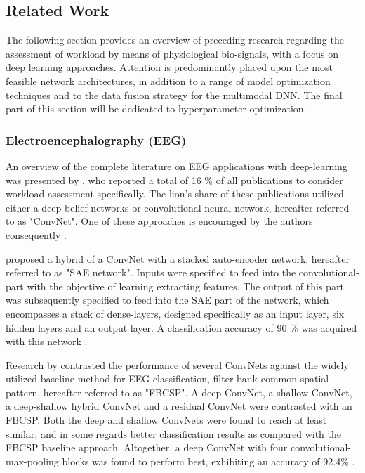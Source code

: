 \documentclass[12pt]{article}
\begin{document}
\subsection{Related Work} 
The following section provides an overview of preceding research regarding the assessment of workload by means of physiological bio-signals, with a focus on deep learning approaches. Attention is predominantly placed upon the most feasible network architectures, in addition to a range of model optimization techniques and to the data fusion strategy for the multimodal DNN. The final part of this section will be dedicated to hyperparameter optimization.  

\subsubsection{Electroencephalography (EEG)}
An overview of the complete literature on EEG applications with deep-learning was presented by , who reported a total of 16 \% of all publications to consider workload assessment specifically. The lion's share of these publications utilized either a deep belief networks or convolutional neural network, hereafter referred to as "ConvNet". One of these approaches is encouraged by the authors consequently \cite{craik2019deep}.

 proposed a hybrid of a ConvNet with a stacked auto-encoder network, hereafter referred to as "SAE network". Inputs were specified to feed into the convolutional-part with the objective of learning extracting features. The output of this part was subsequently specified to feed into the SAE part of the network,  which encompasses a stack of dense-layers, designed specifically as an input layer, six hidden layers and an output layer. A classification accuracy of 90 \% was acquired with this network \cite{tabar2016novel}. 

Research by  contrasted the performance of several ConvNets against the widely utilized baseline method for EEG classification, filter bank common spatial pattern, hereafter referred to as "FBCSP". A deep ConvNet, a shallow ConvNet, a deep-shallow hybrid ConvNet and a residual ConvNet were contrasted with an FBCSP. Both the deep and shallow ConvNets were found to reach at least similar, and in some regards better classification results as compared with the FBCSP baseline approach. Altogether, a deep ConvNet with four convolutional-max-pooling blocks was found to perform best, exhibiting an accuracy of 92.4\% \cite{schirrmeister2017deep}.
\end{document}
